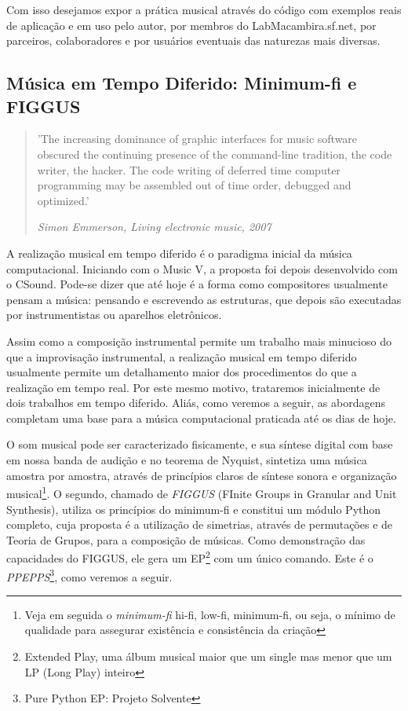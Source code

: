 Com isso desejamos expor a prática musical através do código com
exemplos reais de aplicação e em uso pelo autor, por membros do
LabMacambira.sf.net, por parceiros, colaboradores e por usuários
eventuais das naturezas mais diversas.


\subsection{Música em Tempo Diferido: Minimum-fi e FIGGUS}

\begin{quotation}
\small 'The increasing dominance of graphic interfaces for music
software obscured the continuing presence of the command-line
tradition, the code writer, the hacker. The code writing of deferred
time computer programming may be assembled out of time order, debugged
and optimized.'

\emph{Simon Emmerson, Living electronic music, 2007}
\end{quotation}

A realização musical em tempo diferido é o paradigma inicial da música
computacional. Iniciando com o Music V, a proposta foi depois
desenvolvido com o CSound. Pode-se dizer que até hoje é a forma como
compositores usualmente pensam a música: pensando e escrevendo as
estruturas, que depois são executadas por instrumentistas ou aparelhos
eletrônicos.

Assim como a composição instrumental permite um trabalho mais
minucioso do que a improvisação instrumental, a realização musical em
tempo diferido usualmente permite um detalhamento maior dos
procedimentos do que a realização em tempo real. Por este mesmo
motivo, trataremos inicialmente de dois trabalhos em tempo diferido.
Aliás, como veremos a seguir, as abordagens completam uma base para a
música computacional praticada até os dias de hoje.

O som musical pode ser caracterizado fisicamente, e sua síntese
digital com base em nossa banda de audição e no teorema de Nyquist,
sintetiza uma música amostra por amostra, através de princípios claros
de síntese sonora e organização musical\footnote{Veja em seguida o
  \emph{minimum-fi} hi-fi, low-fi, minimum-fi, ou seja, o mínimo de
  qualidade para assegurar existência e consistência da criação}. O
segundo, chamado de \emph{FIGGUS} (FInite Groups in Granular and Unit
Synthesis), utiliza os princípios do minimum-fi e constitui um módulo
Python completo, cuja proposta é a utilização de simetrias, através de
permutações e de Teoria de Grupos, para a composição de músicas. Como
demonstração das capacidades do FIGGUS, ele gera um
EP\footnote{Extended Play, uma álbum musical maior que um single mas
  menor que um LP (Long Play) inteiro} com um único comando. Este é o
\emph{PPEPPS}\footnote{Pure Python EP: Projeto Solvente}, como veremos
a seguir.

